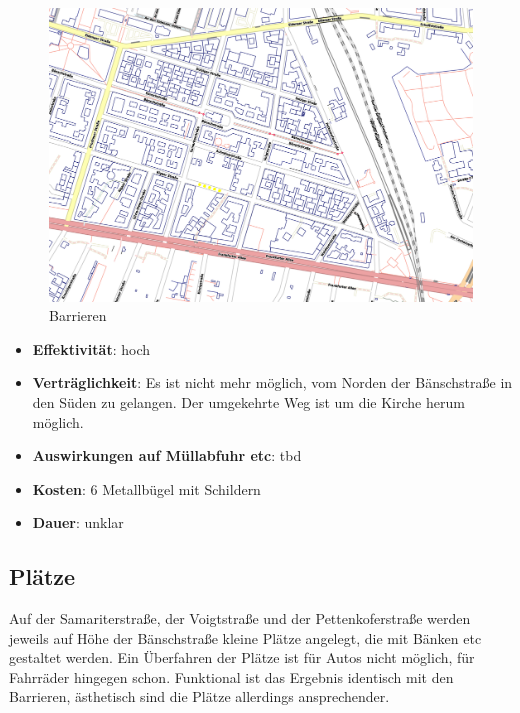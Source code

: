 \documentclass[a4paper,10pt]{scrartcl}
\begin{document}
\begin{figure}[h]
\includegraphics[width=\textwidth]{barriere.png}
\caption{Barrieren}
\end{figure}

\begin{itemize}
 \item \textbf{Effektivität}: hoch
 \item \textbf{Verträglichkeit}: Es ist nicht mehr möglich, vom Norden der Bänschstraße in den Süden zu gelangen. Der umgekehrte Weg ist um die Kirche herum möglich. 
 \item \textbf{Auswirkungen auf Müllabfuhr etc}: tbd
 \item \textbf{Kosten}: 6 Metallbügel mit Schildern
 \item \textbf{Dauer}: unklar  
\end{itemize}
\newpage
\subsection{Plätze}
Auf der Samariterstraße, der Voigtstraße und der Pettenkoferstraße werden jeweils auf Höhe der Bänschstraße kleine Plätze angelegt, die mit Bänken etc gestaltet werden. Ein Überfahren der Plätze ist für Autos nicht möglich, für Fahrräder hingegen schon. Funktional ist das Ergebnis identisch mit den Barrieren, ästhetisch sind die Plätze allerdings ansprechender.
 
\end{document}
